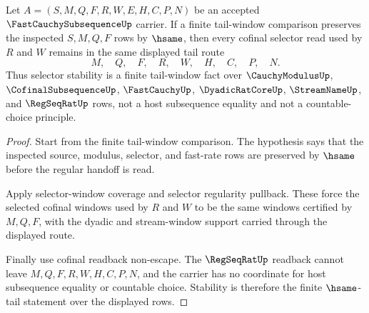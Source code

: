 \begin{theorem}
\label{thm:fast-cauchy-subsequence-cofinal-tail-stability}
Let $A=(S,M,Q,F,R,W,E,H,C,P,N)$ be an accepted $\FastCauchySubsequenceUp$ carrier. If a finite tail-window comparison preserves the inspected $S,M,Q,F$ rows by $\hsame$, then every cofinal selector read used by $R$ and $W$ remains in the same displayed tail route
$$
M,\quad Q,\quad F,\quad R,\quad W,\quad H,\quad C,\quad P,\quad N.
$$
Thus selector stability is a finite tail-window fact over $\CauchyModulusUp$, $\CofinalSubsequenceUp$, $\FastCauchyUp$, $\DyadicRatCoreUp$, $\StreamNameUp$, and $\RegSeqRatUp$ rows, not a host subsequence equality and not a countable-choice principle.
\end{theorem}
\begin{proof}
Start from the finite tail-window comparison. The hypothesis says that the inspected source, modulus, selector, and fast-rate rows are preserved by $\hsame$ before the regular handoff is read.

Apply selector-window coverage and selector regularity pullback. These force the selected cofinal windows used by $R$ and $W$ to be the same windows certified by $M,Q,F$, with the dyadic and stream-window support carried through the displayed route.

Finally use cofinal readback non-escape. The $\RegSeqRatUp$ readback cannot leave $M,Q,F,R,W,H,C,P,N$, and the carrier has no coordinate for host subsequence equality or countable choice. Stability is therefore the finite $\hsame$-tail statement over the displayed rows.
\end{proof}


